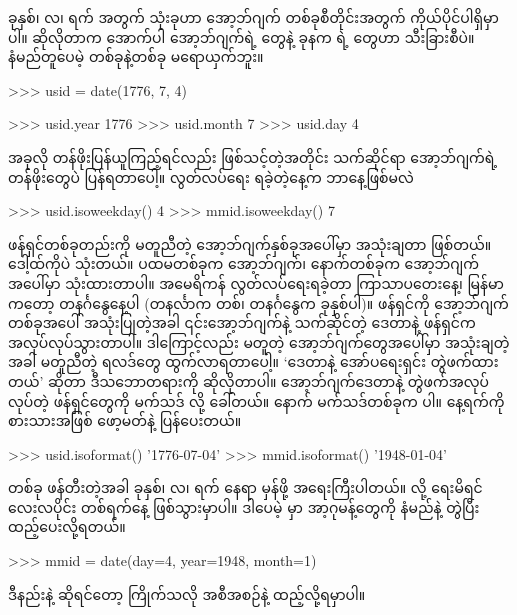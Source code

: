 ခုနှစ်၊ လ၊ ရက် အတွက်  သုံးခုဟာ  အော့ဘ်ဂျက် တစ်ခုစီတိုင်းအတွက် ကိုယ်ပိုင်ပါရှိမှာပါ။ ဆိုလိုတာက ‌အောက်ပါ  အော့ဘ်ဂျက်ရဲ့  တွေနဲ့ ခုနက  ရဲ့  တွေဟာ သီးခြားစီပဲ။ နံမည်တူပေမဲ့ တစ်ခုနဲ့တစ်ခု မရောယှက်ဘူး။
\begin{codetxt}
>>> usid = date(1776, 7, 4)
\end{codetxt}
\betweenminted{\medskipamount}
\begin{codetxt}
>>> usid.year
1776
>>> usid.month
7
>>> usid.day
4
\end{codetxt}
အခုလို တန်ဖိုးပြန်ယူကြည့်ရင်လည်း ဖြစ်သင့်တဲ့အတိုင်း သက်ဆိုင်ရာ အော့ဘ်ဂျက်ရဲ့  တန်ဖိုးတွေပဲ ပြန်ရတာပေါ့။ လွတ်လပ်ရေး ရခဲ့တဲ့နေ့က ဘာနေ့ဖြစ်မလဲ 
\begin{codetxt}
>>> usid.isoweekday()
4
>>> mmid.isoweekday()
7
\end{codetxt}
ဖန်ရှင်တစ်ခုတည်းကို မတူညီတဲ့ အော့ဘ်ဂျက်နှစ်ခုအပေါ်မှာ အသုံးချတာ ဖြစ်တယ်။ ဒေါ့ထ်ကိုပဲ သုံးတယ်။ ပထမတစ်ခုက  အော့ဘ်ဂျက်၊ နောက်တစ်ခုက  အော့ဘ်ဂျက်အပေါ်မှာ သုံးထားတာပါ။ အမေရိကန်  လွတ်လပ်ရေးရခဲ့တာ ကြာသာပတေးနေ့၊ မြန်မာကတော့ တနင်္ဂနွေနေ့ပါ (တနင်္လာက တစ်၊ တနင်္ဂနွေက ခုနှစ်ပါ)။  ဖန်ရှင်ကို အော့ဘ်ဂျက်တစ်ခုအပေါ် အသုံးပြုတဲ့အခါ ၎င်းအော့ဘ်ဂျက်နဲ့ သက်ဆိုင်တဲ့ ဒေတာနဲ့ ဖန်ရှင်က အလုပ်လုပ်သွားတာပါ။ ဒါကြောင့်လည်း  မတူတဲ့ အော့ဘ်ဂျက်တွေအပေါ်မှာ အသုံးချတဲ့အခါ မတူညီတဲ့ ရလဒ်တွေ ထွက်လာရတာပေါ့။ ‘ဒေတာနဲ့ အော်ပရေးရှင်း တွဲဖက်ထားတယ်’ ဆိုတာ ဒီသဘောတရားကို ဆိုလိုတာပါ။ အော့ဘ်ဂျက်ဒေတာနဲ့ တွဲဖက်အလုပ်လုပ်တဲ့ ဖန်ရှင်တွေကို မက်သဒ်  လို့ ခေါ်တယ်။ နောက် မက်သဒ်တစ်ခုက  ပါ။ နေ့ရက်ကို စားသားအဖြစ်  ဖော့မတ်နဲ့ ပြန်ပေးတယ်။
\begin{codetxt}
>>> usid.isoformat()
'1776-07-04'
>>> mmid.isoformat()
'1948-01-04'
\end{codetxt}

 တစ်ခု ဖန်တီးတဲ့အခါ ခုနှစ်၊ လ၊ ရက် နေရာ မှန်ဖို့ အရေးကြီးပါတယ်။  လို့ ရေးမိရင် လေးလပိုင်း တစ်ရက်နေ့ ဖြစ်သွားမှာပါ။ ဒါပေမဲ့  မှာ အာ့ဂုမန့်တွေကို နံမည်နဲ့ တွဲပြီး ထည့်ပေးလို့ရတယ်။ 
\begin{codetxt}
>>> mmid = date(day=4, year=1948, month=1)
\end{codetxt}
ဒီနည်းနဲ့ ဆိုရင်တော့ \fEn{,} \fEn{,}  ကြိုက်သလို အစီအစဉ်နဲ့ ထည့်လို့ရမှာပါ။ 

